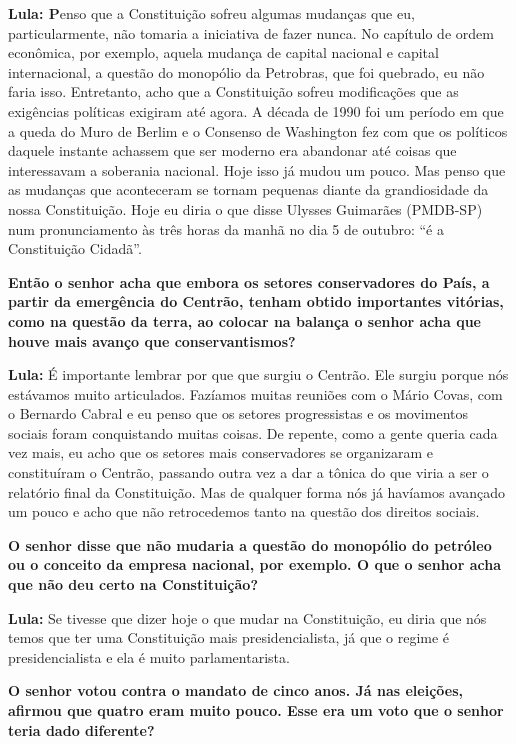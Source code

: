 \textbf{Lula: P}enso que a Constituição sofreu algumas mudanças que eu,
particularmente, não tomaria a iniciativa de fazer nunca. No capítulo de
ordem econômica, por exemplo, aquela mudança de capital nacional e
capital internacional, a questão do monopólio da Petrobras, que foi
quebrado, eu não faria isso. Entretanto, acho que a Constituição sofreu
modificações que as exigências políticas exigiram até agora. A década de
1990 foi um período em que a queda do Muro de Berlim e o Consenso de
Washington fez com que os políticos daquele instante achassem que ser
moderno era abandonar até coisas que interessavam a soberania nacional.
Hoje isso já mudou um pouco. Mas penso que as mudanças que aconteceram
se tornam pequenas diante da grandiosidade da nossa Constituição. Hoje
eu diria o que disse Ulysses Guimarães (PMDB-SP) num pronunciamento às
três horas da manhã no dia 5 de outubro: ``é a Constituição Cidadã''.

\textbf{Então o senhor acha que embora os setores conservadores do País,
a partir da emergência do Centrão, tenham obtido importantes vitórias,
como na questão da terra, ao colocar na balança o senhor acha que houve
mais avanço que conservantismos?}

\textbf{Lula:} É importante lembrar por que que surgiu o Centrão. Ele
surgiu porque nós estávamos muito articulados. Fazíamos muitas reuniões
com o Mário Covas, com o Bernardo Cabral e eu penso que os setores
progressistas e os movimentos sociais foram conquistando muitas coisas.
De repente, como a gente queria cada vez mais, eu acho que os setores
mais conservadores se organizaram e constituíram o Centrão, passando
outra vez a dar a tônica do que viria a ser o relatório final da
Constituição. Mas de qualquer forma nós já havíamos avançado um pouco e
acho que não retrocedemos tanto na questão dos direitos sociais.

\textbf{O senhor disse que não mudaria a questão do monopólio do
petróleo ou o conceito da empresa nacional, por exemplo. O que o senhor
acha que não deu certo na Constituição?}

\textbf{Lula:} Se tivesse que dizer hoje o que mudar na Constituição, eu
diria que nós temos que ter uma Constituição mais presidencialista, já
que o regime é presidencialista e ela é muito parlamentarista.

\textbf{O senhor votou contra o mandato de cinco anos. Já nas eleições,
afirmou que quatro eram muito pouco. Esse era um voto que o senhor teria
dado diferente?}


